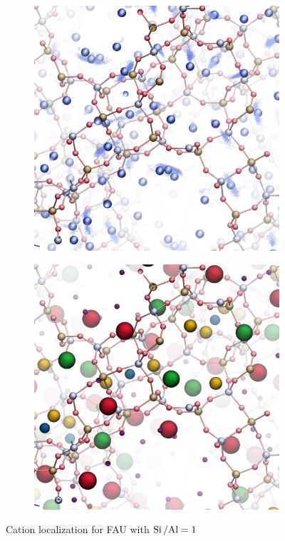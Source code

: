 \documentclass[main.tex]{subfiles}
\begin{document}
\begin{figure}
	\vspace{1em}

	\begin{subfigure}{0.47\columnwidth}
		\centering
		\includegraphics[width=\columnwidth]{figures/cations/FAU1_density_Na.jpg}
		\label{fig:FAUextraction}
	\end{subfigure}\hfill%
	\begin{subfigure}{0.47\columnwidth}
		\centering
		\includegraphics[width=\columnwidth]{figures/cations/FAU1_NaColors.jpg}
		\label{fig:FAUsites}
	\end{subfigure}

	\caption{Cation localization for FAU with $\mbox{Si\,/Al} = 1$}\label{fig:FAU}
\end{figure}
\end{document}

